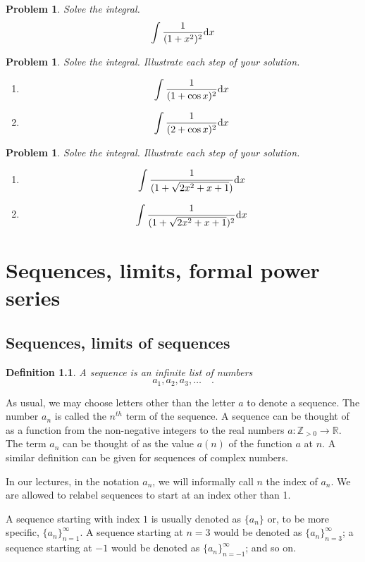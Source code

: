 \documentclass[12pt]{book}
\newtheorem{definition}[theorem]{Definition}
\newtheorem{problem}[theorem]{Problem}
\begin{document}
\begin{problem}
Solve the integral.
\[
\int \frac{1}{(1+x^2)^2}{\normalfont \text{d}} x
\]
\end{problem}

\begin{problem}
Solve the integral. Illustrate each step of your solution.
\begin{enumerate}
\item
\[
\int \frac{1}{(1 + \cos x)^2}{\normalfont \text{d}} x
\]
\item
\[
\int \frac{1}{(2+\cos x)^2}{\normalfont \text{d}} x
\]
\end{enumerate}
\end{problem}
\begin{problem}
Solve the integral. Illustrate each step of your solution.
\begin{enumerate}
\item
\[
\int \frac{1}{(1 + \sqrt{2x^2+x+1})}{\normalfont \text{d}} x
\]
\item
\[
\int \frac{1}{(1 + \sqrt{2x^2+x+1})^2}{\normalfont \text{d}} x
\]
\end{enumerate}
\end{problem}


\chapter{Sequences, limits, formal power series}\label{secSequencesPowerSeries}
\section{Sequences, limits of sequences}
\begin{definition}
 A sequence is an infinite list of numbers
\[
a_1, a_2, a_3, \dots\quad .
\]
\end{definition}
As usual, we may choose letters other than the letter $a$ to denote a sequence. The number $a_n$ is called the $n^{th}$ term of the sequence. A sequence can be thought of as a function from the non-negative integers to the real numbers $a: \mathbb Z_{>0}\to \mathbb R$. The term $a_n$ can be thought of as the value $a(n)$ of the function $a$ at $n$. A similar definition can be given for sequences of complex numbers.

In our lectures, in the notation $a_n$, we will informally call $n$ the index of $a_n$. We are allowed to relabel sequences to start at an index other than 1.

A sequence starting with index $1$ is usually denoted as $\{a_n\}$ or, to be more specific, $\{a_n\}_{n=1}^\infty$. A sequence starting at $n=3$ would be denoted as $\{a_n\}_{n=3}^\infty$; a sequence starting at $-1$ would be denoted as $\{a_n\}_{n=-1}^\infty$; and so on.
\end{document}
